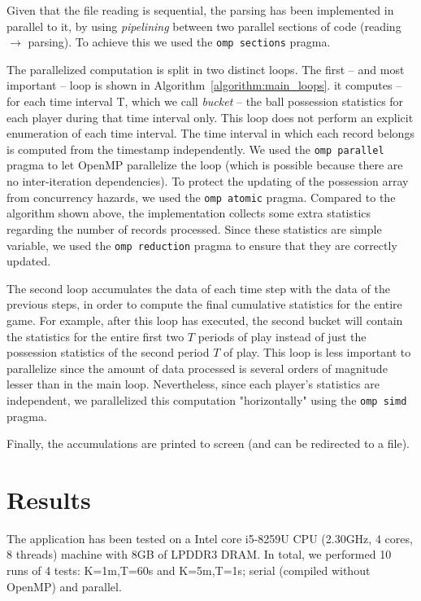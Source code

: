 \documentclass[a4paper, 10pt]{article}
\begin{document}
Given that the file reading is sequential, the parsing has been implemented in parallel to it, by using \emph{pipelining} between two parallel sections of code (reading $\rightarrow$ parsing). To achieve this we used the \texttt{omp sections} pragma.

The parallelized computation is split in two distinct loops. The first -- and most important -- loop is shown in Algorithm~\ref{algorithm:main_loops}. it computes -- for each time interval T, which we call \emph{bucket} -- the ball possession statistics for each player during that time interval only.
This loop does not perform an explicit enumeration of each time interval. The time interval in which each record belongs is computed from the timestamp independently.
We used the \texttt{omp parallel} pragma to let OpenMP parallelize the loop (which is possible because there are no inter-iteration dependencies). To protect the updating of the possession array from concurrency hazards, we used the \texttt{omp atomic} pragma. 
Compared to the algorithm shown above, the implementation collects some extra statistics regarding the number of records processed. Since these statistics are simple variable, we used the \texttt{omp reduction} pragma to ensure that they are correctly updated.

The second loop accumulates the data of each time step with the data of the previous steps, in order to compute the final cumulative statistics for the entire game. For example, after this loop has executed, the second bucket will contain the statistics for the entire first two $T$ periods of play instead of just the possession statistics of the second period $T$ of play.
This loop is less important to parallelize since the amount of data processed is several orders of magnitude lesser than in the main loop. Nevertheless, since each player's statistics are independent, we parallelized this computation "horizontally" using the \texttt{omp simd} pragma.

Finally, the accumulations are printed to screen (and can be redirected to a file).

\section*{Results}

The application has been tested on a Intel core i5-8259U CPU (2.30GHz, 4 cores, 8 threads) machine with 8GB of LPDDR3 DRAM.
In total, we performed 10 runs of 4 tests: K=1m,T=60s and K=5m,T=1s; serial (compiled without OpenMP) and parallel.
\end{document}
